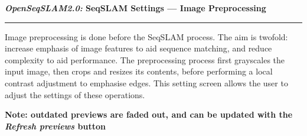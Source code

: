 \centerline{\textbf{\textit{OpenSeqSLAM2.0:} SeqSLAM Settings --- Image Preprocessing}}
\noindent\rule{\textwidth}{2pt}
\bigskip
\parbox{\textwidth}{Image preprocessing is done before the SeqSLAM process. The aim is twofold: increase emphasis of image features to aid sequence matching, and reduce complexity to aid performance. The preprocessing process first grayscales the input image, then crops and resizes its contents, before performing a local contrast adjustment to emphasise edges. This setting screen allows the user to adjust the settings of these operations.}
\smallskip
\parbox{\textwidth}{\textbf{Note: outdated previews are faded out, and can be updated with the \textit{Refresh previews} button}}
\bigskip
